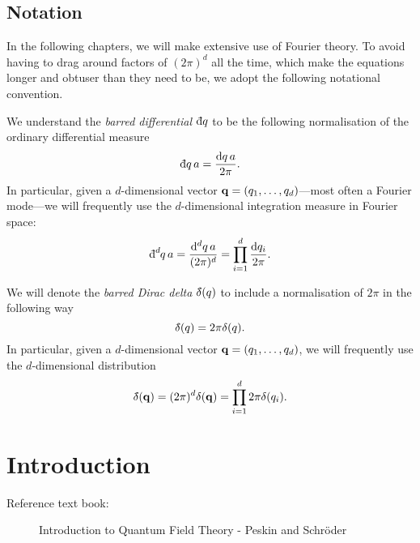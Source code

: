 
\section*{Notation}%
In the following chapters, we will make extensive use of Fourier theory. To avoid having to drag around factors of $(2\pi)^d$ all the time, which make the equations longer and obtuser than they need to be, we adopt the following notational convention.

\begin{notation}
  We understand the \emph{barred differential} $\bdd{q}$ to be the following normalisation of the ordinary differential measure
  \begin{equation}
    \bdd{q} a = \frac{\dd{q} a}{2\pi}.
  \end{equation}
  In particular, given a $d$-dimensional vector $\vb{q} = (q_1, \ldots, q_d)$---most often a Fourier mode---we will frequently use the $d$-dimensional integration measure in Fourier space:
  \begin{equation}
    \bdd[d]{q} a = \frac{\dd[d]{q} a}{(2\pi)^d} = \prod_{i=1}^d \frac{\dd{q_i}}{2\pi}.
  \end{equation}
\end{notation}

\begin{notation}
  We will denote the \emph{barred Dirac delta} $\bdelta(q)$ to include a normalisation of $2\pi$ in the following way
  \begin{equation}
    \bdelta(q) = 2\pi \delta(q).
  \end{equation}
  In particular, given a $d$-dimensional vector $\vb{q} = (q_1, \ldots, q_d)$, we will frequently use the $d$-dimensional distribution
  \begin{equation}
    \bdelta(\vb{q}) = (2\pi)^d \delta(\vb{q}) = \prod_{i=1}^d 2\pi \delta(q_i).
  \end{equation}
\end{notation}

\newpage

\chapter{Introduction}%
\label{cha:lecture_1}

\begin{description}
  \item[Reference text book:] Introduction to Quantum Field Theory - Peskin and Schröder
\end{description}

